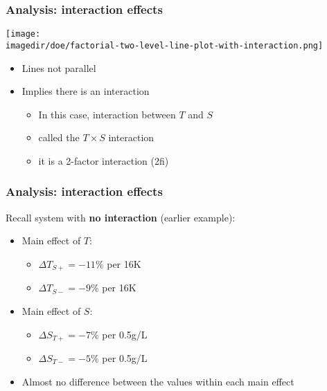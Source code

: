 \begin{frame}\frametitle{Analysis: interaction effects}
	\begin{center}
		\texttt{[image: \\imagedir/doe/factorial-two-level-line-plot-with-interaction.png]}
	\end{center}
	\begin{itemize}
		\item	Lines not parallel
		\item	Implies there is an interaction
		\begin{itemize}
			\item	In this case, interaction between $T$ and $S$
			\item	called the $T \times S$ interaction
			\item	it is a 2-factor interaction (2fi)
		\end{itemize}
	\end{itemize}
\end{frame}

\begin{frame}\frametitle{Analysis: interaction effects}

	Recall system with \textbf{no interaction} (earlier example):
	\begin{itemize}
		\item	Main effect of $T$:
		\begin{itemize}
			\item	$\Delta T_{S+} = -11\%$ per 16K
			\item	$\Delta T_{S-} = -9\%$ per 16K
		\end{itemize}
		\item	Main effect of $S$:
		\begin{itemize}
			\item	$\Delta S_{T+} = -7\%$ per 0.5g/L
			\item	$\Delta S_{T-} = -5\%$ per 0.5g/L
		\end{itemize}
		\item	Almost no difference between the values within each main effect
	\end{itemize}
\end{frame}

